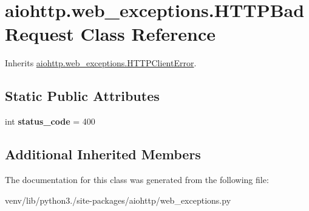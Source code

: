 \hypertarget{classaiohttp_1_1web__exceptions_1_1_h_t_t_p_bad_request}{}\section{aiohttp.\+web\+\_\+exceptions.\+H\+T\+T\+P\+Bad\+Request Class Reference}
\label{classaiohttp_1_1web__exceptions_1_1_h_t_t_p_bad_request}


Inherits \hyperlink{classaiohttp_1_1web__exceptions_1_1_h_t_t_p_client_error}{aiohttp.\+web\+\_\+exceptions.\+H\+T\+T\+P\+Client\+Error}.

\subsection*{Static Public Attributes}
\begin{DoxyCompactItemize}
\item 
\mbox{\label{classaiohttp_1_1web__exceptions_1_1_h_t_t_p_bad_request_a33e3232fd6bb3d2027d6438ca43bd475}} 
int {\bfseries status\+\_\+code} = 400
\end{DoxyCompactItemize}
\subsection*{Additional Inherited Members}


The documentation for this class was generated from the following file\+:\begin{DoxyCompactItemize}
\item 
venv/lib/python3./site-\/packages/aiohttp/web\+\_\+exceptions.\+py\end{DoxyCompactItemize}
